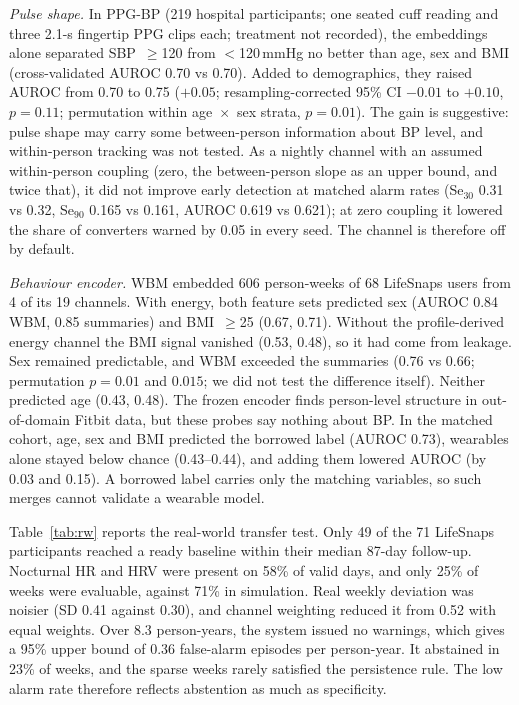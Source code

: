 \documentclass[conference]{IEEEtran}
\begin{document}
\emph{Pulse shape.} In PPG-BP (219 hospital participants; one seated cuff reading and three 2.1-s fingertip PPG clips each; treatment not recorded), the embeddings alone separated SBP~$\geq$120 from $<$120\,mmHg no better than age, sex and BMI (cross-validated AUROC 0.70 vs 0.70). Added to demographics, they raised AUROC from 0.70 to 0.75 ($+0.05$; resampling-corrected 95\% CI $-0.01$ to $+0.10$, $p=0.11$; permutation within age~$\times$~sex strata, $p=0.01$). The gain is suggestive: pulse shape may carry some between-person information about BP level, and within-person tracking was not tested. As a nightly channel with an assumed within-person coupling (zero, the between-person slope as an upper bound, and twice that), it did not improve early detection at matched alarm rates (Se$_{30}$ 0.31 vs 0.32, Se$_{90}$ 0.165 vs 0.161, AUROC 0.619 vs 0.621); at zero coupling it lowered the share of converters warned by 0.05 in every seed. The channel is therefore off by default.

\emph{Behaviour encoder.} WBM embedded 606 person-weeks of 68 LifeSnaps users from 4 of its 19 channels. With energy, both feature sets predicted sex (AUROC 0.84 WBM, 0.85 summaries) and BMI~$\geq$25 (0.67, 0.71). Without the profile-derived energy channel the BMI signal vanished (0.53, 0.48), so it had come from leakage. Sex remained predictable, and WBM exceeded the summaries (0.76 vs 0.66; permutation $p=0.01$ and $0.015$; we did not test the difference itself). Neither predicted age (0.43, 0.48). The frozen encoder finds person-level structure in out-of-domain Fitbit data, but these probes say nothing about BP. In the matched cohort, age, sex and BMI predicted the borrowed label (AUROC 0.73), wearables alone stayed below chance (0.43--0.44), and adding them lowered AUROC (by 0.03 and 0.15). A borrowed label carries only the matching variables, so such merges cannot validate a wearable model.

Table~\ref{tab:rw} reports the real-world transfer test. Only 49 of the 71 LifeSnaps participants reached a ready baseline within their median 87-day follow-up. Nocturnal HR and HRV were present on 58\% of valid days, and only 25\% of weeks were evaluable, against 71\% in simulation. Real weekly deviation was noisier (SD 0.41 against 0.30), and channel weighting reduced it from 0.52 with equal weights. Over 8.3 person-years, the system issued no warnings, which gives a 95\% upper bound of 0.36 false-alarm episodes per person-year. It abstained in 23\% of weeks, and the sparse weeks rarely satisfied the persistence rule. The low alarm rate therefore reflects abstention as much as specificity.
\end{document}
